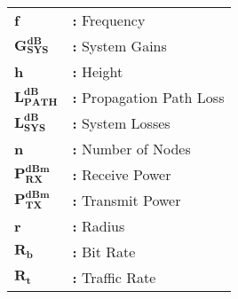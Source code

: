 \hspace{-4mm}
\begin{tabular}{p{2cm}l}
{\bf f} & {\bf:} Frequency\\[1ex]
$\mathbf{G^{dB}_{SYS}}$ & {\bf:} System Gains\\[1ex]
{\bf h} & {\bf:} Height\\[1ex]
$\mathbf{L^{dB}_{PATH}}$ & {\bf:} Propagation Path Loss\\[1ex]
$\mathbf{L^{dB}_{SYS}}$ & {\bf:} System Losses\\[1ex]
{\bf n} & {\bf:} Number of Nodes\\[1ex]
$\mathbf{P^{dBm}_{RX}}$ & {\bf:} Receive Power\\[1ex]
$\mathbf{P^{dBm}_{TX}}$ & {\bf:} Transmit Power\\[1ex]
{\bf r} & {\bf:} Radius\\[1ex]
$\mathbf{R_{b}}$ & {\bf:} Bit Rate\\[1ex]
$\mathbf{R_{t}}$ & {\bf:} Traffic Rate\\[1ex]
\end{tabular}
